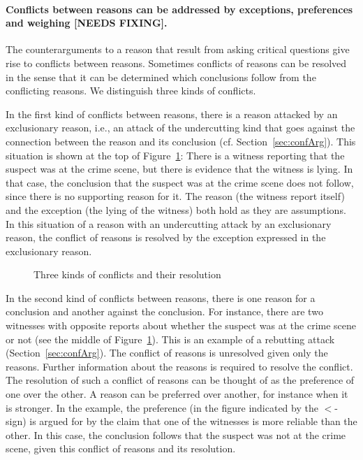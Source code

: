 \documentclass[10pt]{article}
\begin{document}
\paragraph{Conflicts between reasons can be addressed by exceptions, preferences and weighing [NEEDS FIXING].} The counterarguments to a reason that result from asking critical questions give rise to conflicts between reasons. Sometimes conflicts of reasons can be resolved in the sense that it can be determined which conclusions follow from the conflicting reasons. We distinguish three kinds of conflicts. 

In the first kind of conflicts between reasons, there is a reason attacked by an exclusionary reason, i.e., an attack of the undercutting kind that goes against the connection between the reason and its conclusion (cf. Section~\ref{sec:confArg}). This situation is shown at the top of Figure~\ref{fig:conflicts}: There is a witness reporting that the suspect was at the crime scene, but there is evidence that the witness is lying. 
In that case, the conclusion that the suspect was at the crime scene does not follow, since there is no supporting reason for it. The reason (the witness report itself) and the exception (the lying of the witness) both hold as they are assumptions. %
In this situation of a reason with an undercutting attack by an exclusionary reason, the conflict of reasons is resolved by the exception expressed in the exclusionary reason. 

\begin{figure}[bt]
\centering

\caption{Three kinds of conflicts and their resolution\label{fig:conflicts}}
\end{figure}

In the second kind of conflicts between reasons, there is one reason for a conclusion and another against the conclusion. For instance, there are two witnesses with opposite reports about whether the suspect was at the crime scene or not (see the middle of Figure~\ref{fig:conflicts}). This is an example of a rebutting attack (Section~\ref{sec:confArg}). The conflict of reasons is unresolved given only the reasons. Further information about the reasons is required to resolve the conflict. The resolution of such a conflict of reasons can be thought of as the preference of one over the other. A reason can be preferred over another, for instance when it is stronger. In the example, the preference (in the figure indicated by the $<$-sign) is argued for by the claim that one of the witnesses is more reliable than the other. In this case, the conclusion follows that the suspect was not at the crime scene, given this conflict of reasons and its resolution. 
\end{document}
